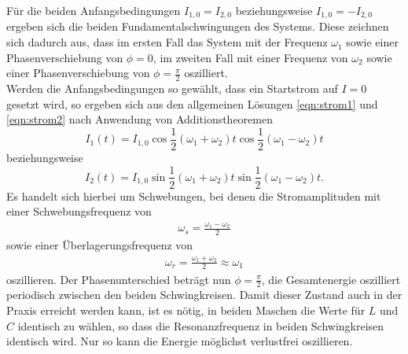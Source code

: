 Für die beiden Anfangsbedingungen $I_{1,0} = I_{2,0}$ beziehungsweise $I_{1,0} = -I_{2,0}$ ergeben sich die beiden Fundamentalschwingungen des Systems.
Diese zeichnen sich dadurch aus, dass im ersten Fall das System mit der Frequenz $\omega_1$ sowie einer Phasenverschiebung von $\phi = 0$, im zweiten Fall mit einer Frequenz von $\omega_2$ sowie einer Phasenverschiebung von $\phi = \frac{\pi}{2}$ oszilliert. \\
Werden die Anfangsbedingungen so gewählt, dass ein Startstrom auf $I=0$ gesetzt wird, so ergeben sich aus den allgemeinen Lösungen \eqref{eqn:strom1} und \eqref{eqn:strom2} nach Anwendung von Additionstheoremen
\begin{equation}
  I_1(t) = I_{1,0} \cos{\frac{1}{2} (\omega_1 + \omega_2) t} \cos{\frac{1}{2} (\omega_1 - \omega_2) t}
\end{equation}
beziehungsweise
\begin{equation}
  I_2(t) = I_{1,0} \sin{\frac{1}{2} (\omega_1 + \omega_2) t} \sin{\frac{1}{2} (\omega_1 - \omega_2) t}.
\end{equation}
Es handelt sich hierbei um Schwebungen, bei denen die Stromamplituden mit einer Schwebungsfrequenz von
\begin{align*}
  \omega_s = \frac{\omega_1 - \omega_2}{2}
\end{align*}
sowie einer Überlagerungsfrequenz von
\begin{align*}
  \omega_r = \frac{\omega_1 + \omega_2}{2} \approx \omega_1
\end{align*}
oszillieren.
Der Phasenunterschied beträgt nun $\phi = \frac{\pi}{2}$, die Gesamtenergie oszilliert periodisch zwischen den beiden Schwingkreisen.
Damit dieser Zustand auch in der Praxis erreicht werden kann, ist es nötig, in beiden Maschen die Werte für $L$ und $C$ identisch zu wählen, so dass die Resonanzfrequenz in beiden Schwingkreisen identisch wird.
Nur so kann die Energie möglichst verlustfrei oszillieren.
